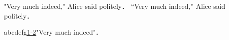 "Very much indeed," Alice said politely． %
``Very much indeed,'' Alice said politely． %

abcdefg\url{1-2}"Very much indeed"．%